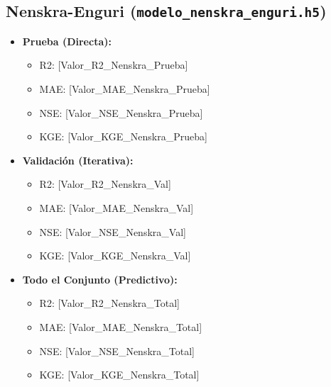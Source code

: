 \documentclass[12pt]{article}
\begin{document}
\subsection*{Nenskra-Enguri (\texttt{modelo\_nenskra\_enguri.h5})}
\begin{itemize}
    \item \textbf{Prueba (Directa):}
    \begin{itemize}
        \item R2: [Valor\_R2\_Nenskra\_Prueba]
        \item MAE: [Valor\_MAE\_Nenskra\_Prueba]
        \item NSE: [Valor\_NSE\_Nenskra\_Prueba]
        \item KGE: [Valor\_KGE\_Nenskra\_Prueba]
    \end{itemize}
    \item \textbf{Validación (Iterativa):}
    \begin{itemize}
        \item R2: [Valor\_R2\_Nenskra\_Val]
        \item MAE: [Valor\_MAE\_Nenskra\_Val]
        \item NSE: [Valor\_NSE\_Nenskra\_Val]
        \item KGE: [Valor\_KGE\_Nenskra\_Val]
    \end{itemize}
    \item \textbf{Todo el Conjunto (Predictivo):}
    \begin{itemize}
        \item R2: [Valor\_R2\_Nenskra\_Total]
        \item MAE: [Valor\_MAE\_Nenskra\_Total]
        \item NSE: [Valor\_NSE\_Nenskra\_Total]
        \item KGE: [Valor\_KGE\_Nenskra\_Total]
    \end{itemize}
\end{itemize}
\end{document}
